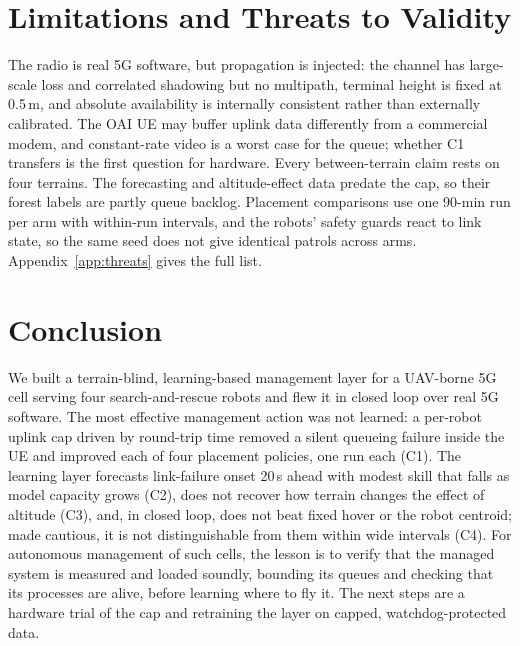 \section{Limitations and Threats to Validity}
\label{sec:limits}

The radio is real 5G software, but propagation is injected: the channel has
large-scale loss and correlated shadowing but no multipath, terminal height is
fixed at 0.5\,m, and absolute availability is internally consistent rather than
externally calibrated. The OAI UE may buffer uplink data differently from a
commercial modem, and constant-rate video is a worst case for the queue;
whether C1 transfers is the first question for hardware. Every
between-terrain claim rests on four terrains. The forecasting and
altitude-effect data predate the cap, so their forest labels are partly queue
backlog. Placement comparisons use one 90-min run per arm with within-run
intervals, and the robots' safety guards react to link state, so the same seed
does not give identical patrols across arms. Appendix~\ref{app:threats} gives
the full list.
\section{Conclusion}
\label{sec:conclusion}

We built a terrain-blind, learning-based management layer for a UAV-borne 5G
cell serving four search-and-rescue robots and flew it in closed loop over real
5G software. The most effective management action was not learned: a per-robot
uplink cap driven by round-trip time removed a silent queueing failure inside
the UE and improved each of four placement policies, one run each (C1). The learning layer forecasts
link-failure onset 20\,s ahead with modest skill that falls as model capacity
grows (C2), does not recover how terrain changes the effect of altitude (C3),
and, in closed loop, does not beat fixed hover or the robot centroid; made
cautious, it is not distinguishable from them within wide intervals (C4). For autonomous management of such
cells, the lesson is to verify that the managed system is measured and loaded
soundly, bounding its queues and checking that its processes are alive, before
learning where to fly it. The next steps are a hardware trial of the cap and
retraining the layer on capped, watchdog-protected data.
